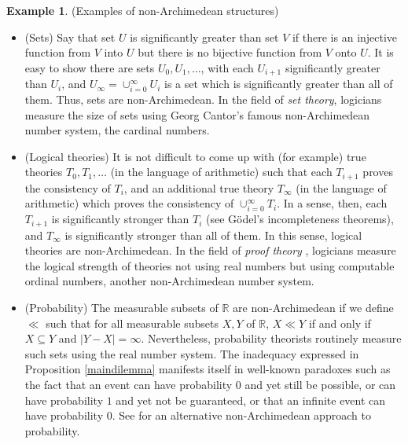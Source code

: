 \documentclass[reqno]{article}
\theoremstyle{definition}
\newtheorem{example}[theorem]{Example}
\begin{document}
\begin{example}
\label{nonexamples}
(Examples of non-Archimedean structures)
    \begin{itemize}
        \item
        (Sets)
        Say that set $U$ is significantly greater than set $V$ if there is an injective
        function from $V$ into $U$ but there is no bijective function from $V$
        onto $U$. It is easy to show there are sets $U_0,U_1,\ldots$, with each
        $U_{i+1}$ significantly greater than $U_i$, and $U_\infty=\cup_{i=0}^\infty U_i$
        is a set which is significantly greater than all of them. Thus, sets are
        non-Archimedean. In the field of \emph{set theory}, logicians measure
        the size of sets using Georg Cantor's famous non-Archimedean number system,
        the cardinal numbers.
        \item
        (Logical theories)
        It is not difficult to come up with (for example) true
        theories $T_0,T_1,\ldots$ (in the language of arithmetic) such that
        each $T_{i+1}$ proves the consistency of $T_i$, and an additional
        true theory $T_\infty$ (in the language of arithmetic)
        which proves the consistency of $\cup_{i=0}^\infty T_i$.
        In a sense, then, each $T_{i+1}$ is significantly stronger than $T_i$
        (see G\"odel's incompleteness theorems), and $T_\infty$ is
        significantly stronger than all of them. In this sense, logical theories
        are non-Archimedean. In the field
        of \emph{proof theory} \cite{pohlers2008proof},
        logicians measure the logical strength of theories not using real numbers
        but using computable ordinal numbers, another non-Archimedean number system.
        \item
        (Probability)
        The measurable subsets of $\mathbb R$ are non-Archimedean
        if we define $\ll$ such that for all measurable subsets
        $X,Y$ of $\mathbb R$, $X\ll Y$ if and only if
        $X\subseteq Y$ and $|Y-X|=\infty$.
        Nevertheless, probability theorists routinely
        measure such sets using the real number system.
        The inadequacy expressed in Proposition \ref{maindilemma}
        manifests itself in well-known paradoxes such as the fact that
        an event can have probability $0$ and yet still be possible,
        or can have probability $1$ and yet not be guaranteed,
        or that an infinite event can have probability $0$.
        See \cite{benci2013non} for an alternative non-Archimedean approach
        to probability.
    \end{itemize}
\end{example}
\end{document}
